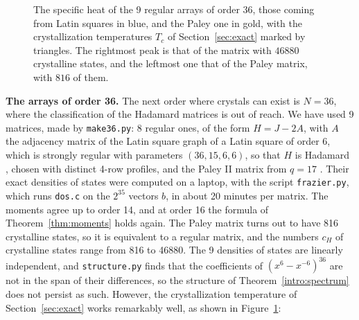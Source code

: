 \documentclass[11pt,a4paper]{article}
\theoremstyle{remark}
\begin{document}
\begin{figure}[htb!]
\caption{The specific heat of the 9 regular arrays of order 36, those coming from Latin squares in blue, and the Paley one in gold, with the crystallization temperatures $T_c$ of Section~\ref{sec:exact} marked by triangles. The rightmost peak is that of the matrix with $46880$ crystalline states, and the leftmost one that of the Paley matrix, with $816$ of them.}\label{fig:order36}
\end{figure}

\noindent\textbf{The arrays of order 36.} The next order where crystals can exist is $N=36$, where the classification of the Hadamard matrices is out of reach. We have used 9 matrices, made by \texttt{make36.py}: 8 regular ones, of the form $H=J-2A$, with $A$ the adjacency matrix of the Latin square graph of a Latin square of order 6, which is strongly regular with parameters $(36,15,6,6)$, so that $H$ is Hadamard \cite{gos}, chosen with distinct 4-row profiles, and the Paley II matrix from $q=17$ \cite{pal}. Their exact densities of states were computed on a laptop, with the script \texttt{frazier.py}, which runs \texttt{dos.c} on the $2^{35}$ vectors $b$, in about 20 minutes per matrix. The moments agree up to order 14, and at order 16 the formula of Theorem~\ref{thm:moments} holds again. The Paley matrix turns out to have 816 crystalline states, so it is equivalent to a regular matrix, and the numbers $c_H$ of crystalline states range from 816 to 46880. The 9 densities of states are linearly independent, and \texttt{structure.py} finds that the coefficients of $(x^6-x^{-6})^{36}$ are not in the span of their differences, so the structure of Theorem~\ref{intro:spectrum} does not persist as such. However, the crystallization temperature of Section~\ref{sec:exact} works remarkably well, as shown in Figure~\ref{fig:order36}:
\end{document}
